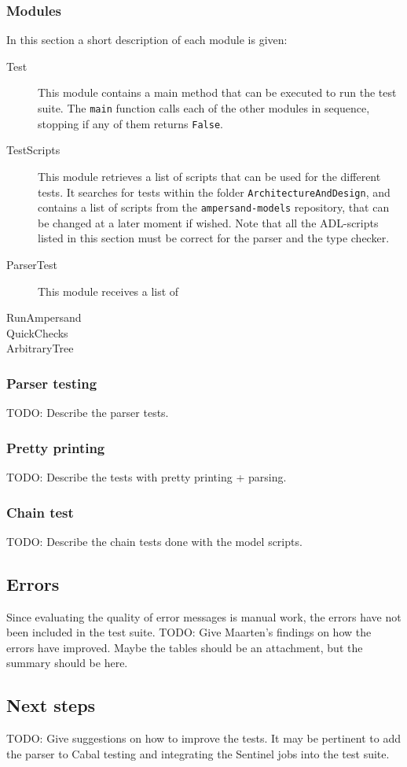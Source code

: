   \subsubsection{Modules}
  \label{subsec:modules}
  In this section a short description of each module is given:%
  \begin{description}
    \item[Test] This module contains a main method that can be executed to run the test suite.
      The \texttt{main} function calls each of the other modules in sequence, stopping if any of them returns \texttt{False}.
    
    \item[TestScripts] This module retrieves a list of scripts that can be used for the different tests.
      It searches for tests within the folder \texttt{ArchitectureAndDesign}, and contains a list of scripts from the \texttt{ampersand-models} repository, that can be changed at a later moment if wished.
      Note that all the ADL-scripts listed in this section must be correct for the parser and the type checker.
    
    \item[ParserTest] This module receives a list of 
    
    \item[RunAmpersand]
    
    \item[QuickChecks]
    
    \item[ArbitraryTree]
  \end{description}

  \subsubsection{Parser testing}
  TODO: Describe the parser tests.

  \subsubsection{Pretty printing}
  TODO: Describe the tests with pretty printing + parsing.

  \subsubsection{Chain test}
  TODO: Describe the chain tests done with the model scripts.

\subsection{Errors}
  Since evaluating the quality of error messages is manual work, the errors have not been included in the test suite.
  TODO: Give Maarten's findings on how the errors have improved. Maybe the tables should be an attachment, but the summary should be here.

\subsection{Next steps}
  TODO: Give suggestions on how to improve the tests.
  It may be pertinent to add the parser to Cabal testing and integrating the Sentinel jobs into the test suite.